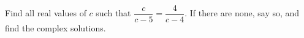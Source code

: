 Find all real values of $c$ such that $\dfrac{c}{c-5}=\dfrac{4}{c-4}$. If there are none, say so, and find the complex solutions.
